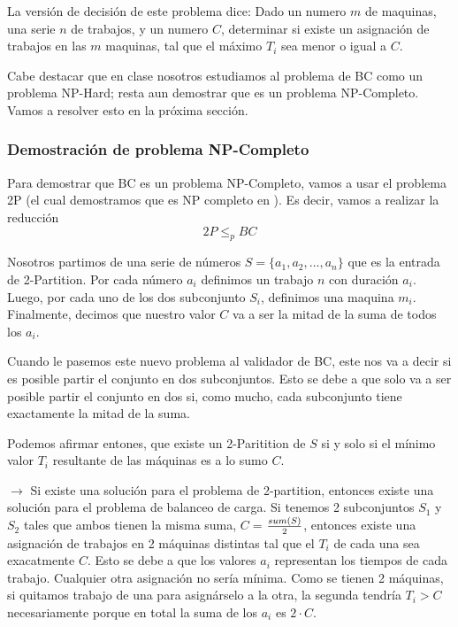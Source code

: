 \documentclass{article}
\begin{document}
La versión de decisión de este problema dice: Dado un numero $m$ de maquinas, una serie $n$ de trabajos, y un numero $C$, determinar si existe un asignación de trabajos en las $m$ maquinas, tal que el máximo $T_i$ sea menor o igual a $C$.

Cabe destacar que en clase nosotros estudiamos al problema de BC como un problema NP-Hard; resta aun demostrar que es un problema NP-Completo. Vamos a resolver esto en la próxima sección.

\subsubsection{Demostración de problema NP-Completo}
\label{sec:np-completo-bc}
Para demostrar que BC es un problema NP-Completo, vamos a usar el problema 2P (el cual demostramos que es NP completo en ). Es decir, vamos a realizar la reducción
$$
2P \leq_p BC
$$

Nosotros partimos de una serie de números $S = \{a_1, a_2, \ldots, a_n \}$ que es la entrada de 2-Partition. Por cada número $a_i$ definimos un trabajo $n$ con duración $a_i$.  
Luego, por cada uno de los dos subconjunto $S_i$, definimos una maquina $m_i$. 
Finalmente, decimos que nuestro valor $C$ va a ser la mitad de la suma de todos los $a_i$.

Cuando le pasemos este nuevo problema al validador de BC, este nos va a decir si es posible partir el conjunto en dos subconjuntos. Esto se debe a que solo va a ser posible partir el conjunto en dos si, como mucho, cada subconjunto tiene exactamente la mitad de la suma. 

Podemos afirmar entones, que existe un 2-Paritition de $S$ si y solo si el mínimo valor $T_i$ resultante de las máquinas es a lo sumo $C$.

$\rightarrow$ Si existe una solución para el problema de 2-partition, entonces existe una solución para el problema de balanceo de carga. Si tenemos 2 subconjuntos $S_1$ y $S_2$ tales que ambos tienen la misma suma, $C =$$ sum(S) \over 2$, entonces existe una asignación de trabajos en 2 máquinas distintas tal que el $T_i$ de cada una sea exacatmente $C$. Esto se debe a que los valores $a_i$ representan los tiempos de cada trabajo. Cualquier otra asignación no sería mínima. Como se tienen 2 máquinas, si quitamos trabajo de una para asignárselo a la otra, la segunda tendría $T_i > C$ necesariamente porque en total la suma de los $a_i$ es $2 \cdot C$.
\end{document}
